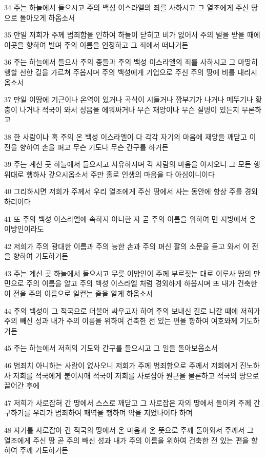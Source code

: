 \par 34 주는 하늘에서 들으시고 주의 백성 이스라엘의 죄를 사하시고 그 열조에게 주신 땅으로 돌아오게 하옵소서
\par 35 만일 저희가 주께 범죄함을 인하여 하늘이 닫히고 비가 없어서 주의 벌을 받을 때에 이곳을 향하여 빌며 주의 이름을 인정하고 그 죄에서 떠나거든
\par 36 주는 하늘에서 들으사 주의 종들과 주의 백성 이스라엘의 죄를 사하시고 그 마땅히 행할 선한 길을 가르쳐 주옵시며 주의 백성에게 기업으로 주신 주의 땅에 비를 내리시옵소서
\par 37 만일 이땅에 기근이나 온역이 있거나 곡식이 시들거나 깜부기가 나거나 메뚜기나 황충이 나거나 적국이 와서 성읍을 에워싸거나 무슨 재앙이나 무슨 질병이 있든지 무론하고
\par 38 한 사람이나 혹 주의 온 백성 이스라엘이 다 각각 자기의 마음에 재앙을 깨닫고 이 전을 향하여 손을 펴고 무슨 기도나 무슨 간구를 하거든
\par 39 주는 계신 곳 하늘에서 들으시고 사유하시며 각 사람의 마음을 아시오니 그 모든 행위대로 행하사 갚으시옵소서 주만 홀로 인생의 마음을 다 아심이니이다
\par 40 그리하시면 저희가 주께서 우리 열조에게 주신 땅에서 사는 동안에 항상 주를 경외하리이다
\par 41 또 주의 백성 이스라엘에 속하지 아니한 자 곧 주의 이름을 위하여 먼 지방에서 온 이방인이라도
\par 42 저희가 주의 광대한 이름과 주의 능한 손과 주의 펴신 팔의 소문을 듣고 와서 이 전을 향하여 기도하거든
\par 43 주는 계신 곳 하늘에서 들으시고 무릇 이방인이 주께 부르짖는 대로 이루사 땅의 만민으로 주의 이름을 알고 주의 백성 이스라엘 처럼 경외하게 하옵시며 또 내가 건축한 이 전을 주의 이름으로 일컫는 줄을 알게 하옵소서
\par 44 주의 백성이 그 적국으로 더불어 싸우고자 하여 주의 보내신 길로 나갈 때에 저희가 주의 빼신 성과 내가 주의 이름을 위하여 건축한 전 있는 편을 향하여 여호와께 기도하거든
\par 45 주는 하늘에서 저희의 기도와 간구를 들으시고 그 일을 돌아보옵소서
\par 46 범죄치 아니하는 사람이 없사오니 저희가 주께 범죄함으로 주께서 저희에게 진노하사 저희를 적국에게 붙이시매 적국이 저희를 사로잡아 원근을 물론하고 적국의 땅으로 끌어간 후에
\par 47 저희가 사로잡혀 간 땅에서 스스로 깨닫고 그 사로잡은 자의 땅에서 돌이켜 주께 간구하기를 우리가 범죄하여 패역을 행하며 악을 지었나이다 하며
\par 48 자기를 사로잡아 간 적국의 땅에서 온 마음과 온 뜻으로 주께 돌아와서 주께서 그 열조에게 주신 땅 곧 주의 빼신 성과 내가 주의 이름을 위하여 건축한 전 있는 편을 향하여 주께 기도하거든
